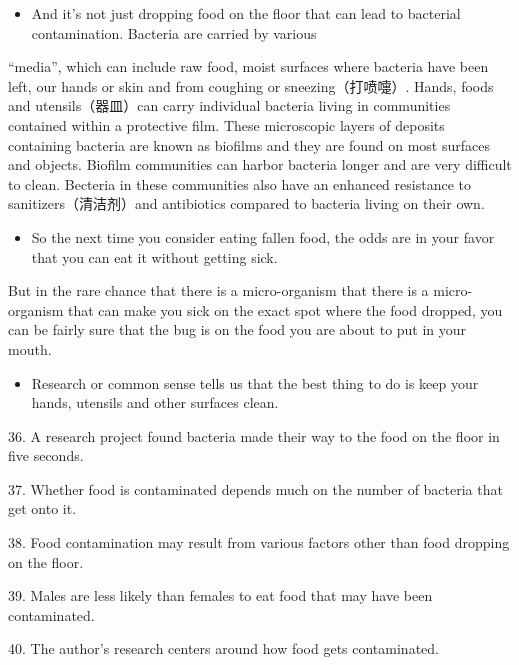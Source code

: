 \documentclass[UTF8,11pt]{ctexart}
\begin{document}
\begin{itemize}[leftmargin=2em,itemsep=.2em,topsep=.4em]\item[L.] And it’s not just dropping food on the floor that can lead to bacterial contamination. Bacteria are carried by various
\end{itemize}

“media”, which can include raw food, moist surfaces where bacteria have been left, our hands or skin and from coughing or sneezing（打喷嚏）. Hands, foods and utensils（器皿）can carry individual bacteria living in communities contained within a protective film. These microscopic layers of deposits containing bacteria are known as biofilms and they are found on most surfaces and objects. Biofilm communities can harbor bacteria longer and are very difficult to clean. Becteria in these communities also have an enhanced resistance to sanitizers（清洁剂）and antibiotics compared to bacteria living on their own.


\begin{itemize}[leftmargin=2em,itemsep=.2em,topsep=.4em]\item[M.] So the next time you consider eating fallen food, the odds are in your favor that you can eat it without getting sick.
\end{itemize}

But in the rare chance that there is a micro-organism that there is a micro-organism that can make you sick on the exact spot where the food dropped, you can be fairly sure that the bug is on the food you are about to put in your mouth.


\begin{itemize}[leftmargin=2em,itemsep=.2em,topsep=.4em]\item[N.] Research or common sense tells us that the best thing to do is keep your hands, utensils and other surfaces clean.
\end{itemize}

36. A research project found bacteria made their way to the food on the floor in five seconds.


37. Whether food is contaminated depends much on the number of bacteria that get onto it.


38. Food contamination may result from various factors other than food dropping on the floor.


39. Males are less likely than females to eat food that may have been contaminated.


40. The author’s research centers around how food gets contaminated.
\end{document}
